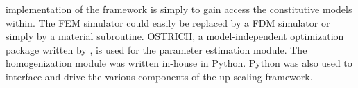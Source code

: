 implementation of the framework is simply to gain access the constitutive models within.  The FEM simulator could easily be replaced by a FDM simulator or simply by a material subroutine.  OSTRICH, a model-independent optimization package written by \citet{matott_ostrich:_2016}, is used for the parameter estimation module. The homogenization module was written in-house in Python. Python was also used to interface and drive the various components of the up-scaling framework. 




